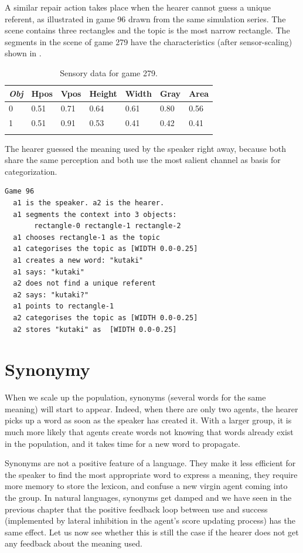 A similar repair action takes place when the hearer
cannot guess a unique referent, as illustrated in
game 96 drawn from the same simulation series. 
The scene contains three rectangles and the 
topic is the most narrow rectangle. The segments in the scene of game 279
have the characteristics (after sensor-scaling) shown in . 
\begin{table}
\begin{center}
\begin{tabular}{ l  l  l  l  l  l  l }
\lsptoprule
{\it Obj}&Hpos&Vpos&Height&Width&Gray&Area \\ \midrule
0 &0.51 & 0.71 & 0.64 & 0.61 & 0.80 & 0.56\\ \midrule
1 & 0.51 & 0.91 & 0.53 & 0.41 & 0.42 & 0.41 \\ \midrule
\lspbottomrule
\end{tabular}
\caption{\label{tab:279} Sensory data for game 279.}
\end{center}
\end{table}
The hearer guessed the meaning used
by the speaker right away, because both 
share the same perception and both use the most 
salient channel as basis for categorization. 
\begin{verbatim}
Game 96
  a1 is the speaker. a2 is the hearer. 
  a1 segments the context into 3 objects: 
       rectangle-0 rectangle-1 rectangle-2
  a1 chooses rectangle-1 as the topic 
  a1 categorises the topic as [WIDTH 0.0-0.25]
  a1 creates a new word: "kutaki"
  a1 says: "kutaki"
  a2 does not find a unique referent
  a2 says: "kutaki?"
  a1 points to rectangle-1
  a2 categorises the topic as [WIDTH 0.0-0.25]
  a2 stores "kutaki" as  [WIDTH 0.0-0.25]
\end{verbatim}

\section{Synonymy}

When we scale up the population, synonyms (several words
for the same meaning) will start to appear. Indeed,
when there are only two agents, the hearer picks 
up a word as soon as the speaker has created it. With a larger
group, it is much more likely that agents create words
not knowing that words already exist in the population, and 
it takes time for a new word to propagate. 

Synonyms are not a positive feature of a language. They make 
it less efficient for the speaker to find the most 
appropriate word to express a meaning, they require more
memory to store the lexicon, and confuse a new virgin 
agent coming into the group. In natural languages, synonyms get
damped and we have seen in the previous chapter
that the positive feedback loop between 
use and success (implemented by lateral inhibition
in the agent's score updating process) has the same
effect. Let us now see whether this is still the 
case if the hearer does not get any feedback about the
meaning used. 

